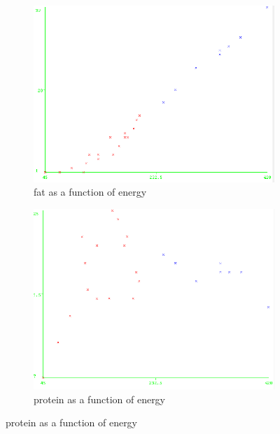 \documentclass[letterpaper,12pt]{article}
\begin{document}
\begin{figure}[H]
\begin{subfigure}{.4\textwidth}
  \centering
  \includegraphics[width=.8\linewidth]{kmeans_seed10_2cl_energy_fat}  
  \caption{fat as a function of energy}
  \label{fig:sub-first_1}
\end{subfigure}
\begin{subfigure}{.4\textwidth}
  \centering
  \includegraphics[width=.8\linewidth]{kmeans_seed10_2cl_energy_protein}  
  \caption{protein as a function of energy}
  \label{fig:sub-second_1}
\end{subfigure}



\end{figure}
\end{document}
